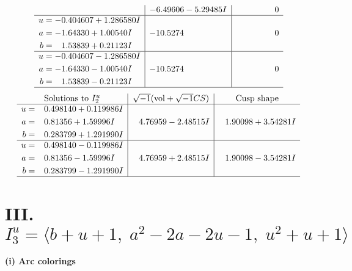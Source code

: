 \documentclass[1p]{elsarticle_modified}
\theoremstyle{definition}
\newcommand{\I}{\sqrt{-1}}
\begin{document}
$$\begin{array}{c|c|c}
 & -6.49606 - 5.29485 I & \phantom{-0.000000 } 0 \\ \hline\begin{aligned}
u &= -0.404607 + 1.286580 I \\
a &= -1.64330 + 1.00540 I \\
b &= \phantom{-}1.53839 + 0.21123 I\end{aligned}
 & -10.5274\phantom{ +0.000000I} & \phantom{-0.000000 } 0 \\ \hline\begin{aligned}
u &= -0.404607 - 1.286580 I \\
a &= -1.64330 - 1.00540 I \\
b &= \phantom{-}1.53839 - 0.21123 I\end{aligned}
 & -10.5274\phantom{ +0.000000I} & \phantom{-0.000000 } 0\\
 \hline 
 \end{array}$$\newpage$$\begin{array}{c|c|c}  
\text{Solutions to }I^u_{2}& \I (\text{vol} + \sqrt{-1}CS) & \text{Cusp shape}\\
 \hline 
\begin{aligned}
u &= \phantom{-}0.498140 + 0.119986 I \\
a &= \phantom{-}0.81356 + 1.59996 I \\
b &= \phantom{-}0.283799 + 1.291990 I\end{aligned}
 & \phantom{-}4.76959 - 2.48515 I & \phantom{-}1.90098 + 3.54281 I \\ \hline\begin{aligned}
u &= \phantom{-}0.498140 - 0.119986 I \\
a &= \phantom{-}0.81356 - 1.59996 I \\
b &= \phantom{-}0.283799 - 1.291990 I\end{aligned}
 & \phantom{-}4.76959 + 2.48515 I & \phantom{-}1.90098 - 3.54281 I\\
 \hline 
 \end{array}$$\newpage\newpage\renewcommand{\arraystretch}{1}
\centering \section*{III. $I^u_{3}= \langle b+u+1,\;a^2-2 a-2 u-1,\;u^2+u+1 \rangle$}
\flushleft \textbf{(i) Arc colorings}\\
\end{document}

